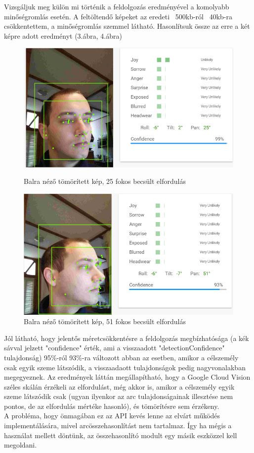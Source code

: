 Vizsgáljuk meg külön mi történik a feldolgozás eredményével a komolyabb minőségromlás esetén. A feltöltendő képeket az eredeti ~500kb-ról ~40kb-ra csökkentettem, a minőségromlás szemmel látható. Hasonlítsuk össze az erre a két képre adott eredményt (3.ábra, 4.ábra)
\begin{figure}[h]
 \begin{minipage}{.5\textwidth} 
\centering
    \includegraphics[scale=0.3]{img/cloud_vision_left_compressed}
    \caption{Balra néző tömörített kép, 25 fokos becsült elfordulás}
 \end{minipage}
 \begin{minipage}{.5\textwidth} 
\centering
     \includegraphics[scale=0.3]{img/cloud_vision_very_left_compressed}
     \caption{Balra néző tömörített kép, 51 fokos becsült elfordulás}
 \end{minipage}
\end{figure}

Jól látható, hogy jelentős méretcsökkentésre a feldolgozás megbízhatósága (a kék sávval jelzett "confidence" érték, ami a visszaadott "detectionConfidence" tulajdonság) 95\%-ról 93\%-ra változott abban az esetben, amikor a célszemély csak egyik szeme látszódik, a visszaadaott tulajdonságok pedig nagyvonalakban megegyeznek. 
Az eredmények láttán megállapítható, hogy a Google Cloud Vision széles skálán érzékeli az elfordulást, még akkor is, amikor a célszemély egyik szeme látszódik csak (ugyan ilyenkor az arc tulajdonságainak illesztése nem pontos, de az elfordulás mértéke hasonló), és tömörítésre sem érzékeny.
\\A probléma, hogy önmagában ez az API kevés lenne az elvárt működés implementálására, mivel arcösszehasonlítást nem tartalmaz. Így ha mégis a használat mellett döntünk, az összehasonlító modult egy másik eszközzel kell megoldani.

